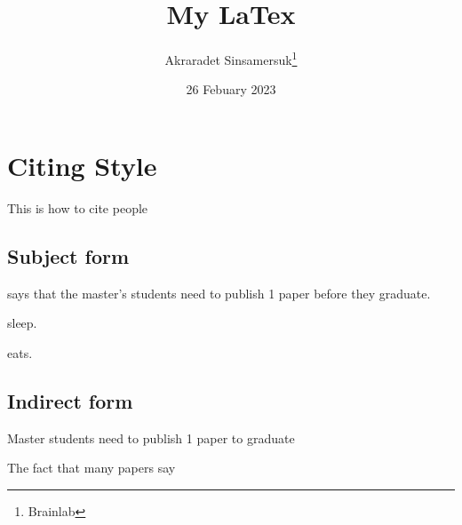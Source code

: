 \documentclass{article}
\title{My LaTex}
\author{Akraradet Sinsamersuk\thanks{Brainlab}}
\date{26 Febuary 2023}
\begin{document}
\maketitle
\newpage

\tableofcontents
\newpage






\section{Citing Style}

This is how to cite people

\subsection{Subject form}

\textcite{chaky} says that the master's students need to publish 1 paper before they graduate.

\textcite{2author} sleep.

\textcite{3author} eats.

\subsection{Indirect form}

Master students need to publish 1 paper to graduate \parencite[18-20]{chaky}

The fact that many papers say \parencite{chaky,2author,3author}

\cite{vaswani2017attention}

\printbibliography %
\end{document}

